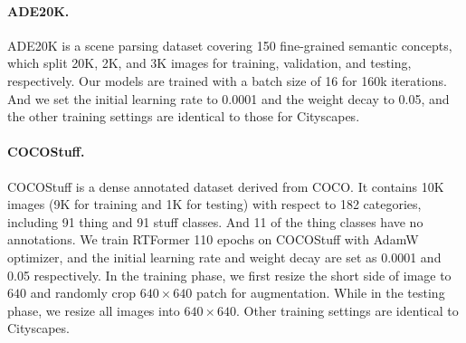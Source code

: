 \documentclass{article}
\begin{document}
\vspace{-2mm}
\paragraph{ADE20K.}
ADE20K\cite{ADE20K} is a scene parsing dataset covering 150 fine-grained semantic concepts, which split 20K, 2K, and 3K images for training, validation, and testing, respectively. Our models are trained with a batch size of 16 for 160k iterations. And we set the initial learning rate to 0.0001 and the weight decay to 0.05, and the other training settings are identical to those for Cityscapes\cite{Cityscapes}.

\vspace{-2mm}
\paragraph{COCOStuff.}
COCOStuff\cite{caesar2018coco} is a dense annotated dataset derived from COCO. It contains 10K images (9K for training and 1K for testing) with respect to 182 categories, including 91 thing and 91 stuff classes. And 11 of the thing classes have no annotations. We train RTFormer 110 epochs on COCOStuff with AdamW optimizer, and the initial learning rate and weight decay are set as 0.0001 and 0.05 respectively. In the training phase, we first resize the short side of image to $640$ and randomly crop $640\times 640$ patch for augmentation. While in the testing phase, we resize all images into $640\times 640$. Other training settings are identical to Cityscapes.
\end{document}
